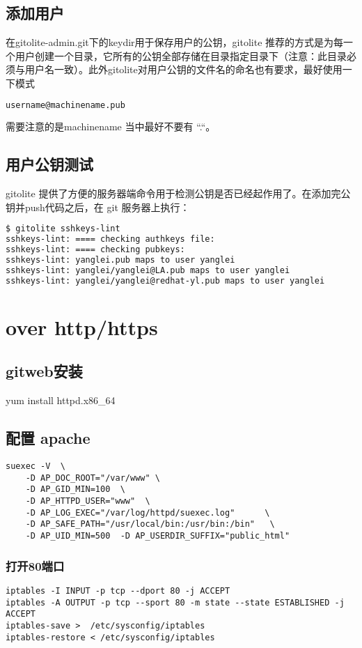 \documentclass[a4paper,11pt,twoside,openany]{article}
\begin{document}
\subsection{添加用户}
在gitolite-admin.git下的keydir用于保存用户的公钥，gitolite 推荐的方式是为每一个用户创建一个目录，它所有的公钥全部存储在目录指定目录下（注意：此目录必须与用户名一致）。此外gitolite对用户公钥的文件名的命名也有要求，最好使用一下模式
\begin{lstlisting}[language=bash]
  username@machinename.pub
\end{lstlisting}
需要注意的是machinename 当中最好不要有 “.“。

\subsection{用户公钥测试}
gitolite 提供了方便的服务器端命令用于检测公钥是否已经起作用了。在添加完公钥并push代码之后，在 git 服务器上执行：
\begin{lstlisting}[language=bash]
$ gitolite sshkeys-lint 
sshkeys-lint: ==== checking authkeys file:
sshkeys-lint: ==== checking pubkeys:
sshkeys-lint: yanglei.pub maps to user yanglei
sshkeys-lint: yanglei/yanglei@LA.pub maps to user yanglei
sshkeys-lint: yanglei/yanglei@redhat-yl.pub maps to user yanglei
\end{lstlisting}

\section{over http/https}
\subsection{gitweb安装}
yum install httpd.x86\_64

\subsection{配置 apache}
\begin{lstlisting}
suexec -V  \
    -D AP_DOC_ROOT="/var/www" \ 
    -D AP_GID_MIN=100  \
    -D AP_HTTPD_USER="www"  \
    -D AP_LOG_EXEC="/var/log/httpd/suexec.log"      \
    -D AP_SAFE_PATH="/usr/local/bin:/usr/bin:/bin"   \
    -D AP_UID_MIN=500  -D AP_USERDIR_SUFFIX="public_html"
\end{lstlisting}

\subsubsection{打开80端口}
\begin{lstlisting}
iptables -I INPUT -p tcp --dport 80 -j ACCEPT
iptables -A OUTPUT -p tcp --sport 80 -m state --state ESTABLISHED -j ACCEPT
iptables-save >  /etc/sysconfig/iptables
iptables-restore < /etc/sysconfig/iptables
\end{lstlisting}
\end{document}
